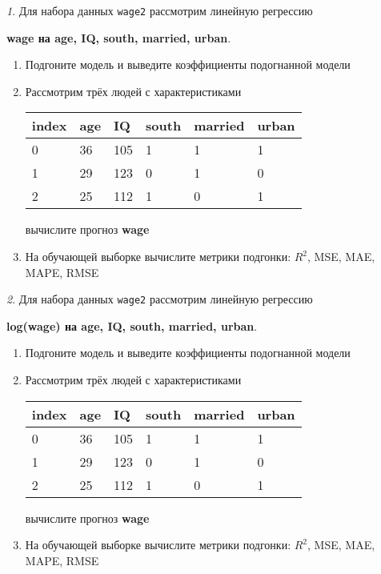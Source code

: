 \documentclass[12pt]{article}
\theoremstyle{remark}
\newtheorem{exercise}{}[section]
\begin{document}
\begin{exercise}
Для набора данных \texttt{wage2} рассмотрим линейную регрессию 
\begin{center}
	\textbf{wage на age, IQ, south, married, urban}.
\end{center}
\begin{enumerate}
	\item Подгоните модель и выведите коэффициенты подогнанной модели
	\item Рассмотрим трёх людей с характеристиками
	\begin{center}
		\begin{tabular}{|l||l|l|l|l|l|}\hline
			index & age & IQ & south & married & urban \\ \hline\hline
			0 & 36 & 105 & 1 & 1 & 1 \\
			1 & 29 & 123 & 0 & 1 & 0 \\
			2 & 25 & 112 & 1 & 0 & 1 \\ \hline
		\end{tabular}
	\end{center}
	вычислите прогноз \textbf{wage} 
	\item На обучающей выборке вычислите метрики подгонки: \(R^2\), 
	MSE, MAE, MAPE, RMSE
\end{enumerate}
\end{exercise}

\begin{exercise}
Для набора данных \texttt{wage2} рассмотрим линейную регрессию 
\begin{center}
	\textbf{log(wage) на age, IQ, south, married, urban}.
\end{center}
\begin{enumerate}
	\item Подгоните модель и выведите коэффициенты подогнанной модели
	\item Рассмотрим трёх людей с характеристиками
	\begin{center}
		\begin{tabular}{|l||l|l|l|l|l|}\hline
			index & age & IQ & south & married & urban \\ \hline\hline
			0 & 36 & 105 & 1 & 1 & 1 \\
			1 & 29 & 123 & 0 & 1 & 0 \\
			2 & 25 & 112 & 1 & 0 & 1 \\ \hline
		\end{tabular}
	\end{center}
	вычислите прогноз \textbf{wage} 
	\item На обучающей выборке вычислите метрики подгонки: \(R^2\), 
	MSE, MAE, MAPE, RMSE
\end{enumerate}
\end{exercise}
\end{document}
